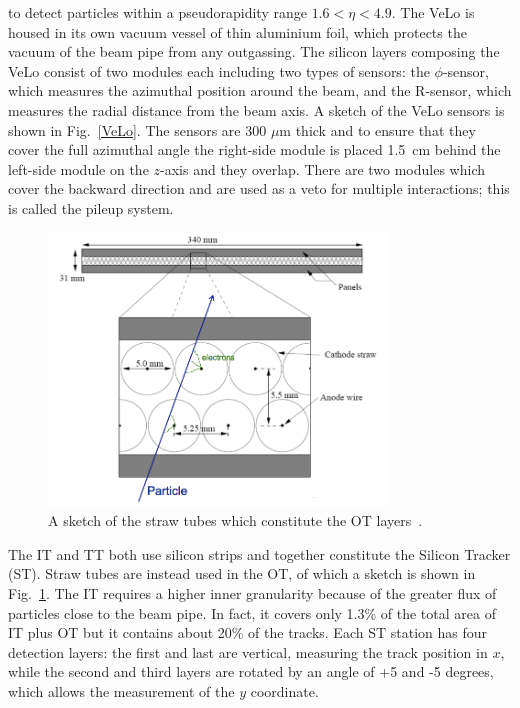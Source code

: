 to detect particles within a pseudorapidity range $1.6 < \eta < 4.9$. The VeLo is housed in its own
vacuum vessel of thin aluminium foil, which protects the vacuum of the beam pipe from any outgassing. 
The silicon layers composing the VeLo consist of two modules each including two types of sensors:
the $\phi$-sensor, which measures the azimuthal position around the beam, and the R-sensor, which measures
the radial distance from the beam axis. A sketch of the VeLo sensors is shown in Fig.~\ref{VeLo}. The sensors
are 300 $\mu$m thick and to ensure that they cover the full azimuthal angle the right-side module is placed
1.5~cm behind the left-side module on the $z$-axis and they overlap. There are two modules which cover the
backward direction and are used as a veto for multiple interactions; this is called the pileup system.
%
\begin{center}
\begin{figure}[h!]
\centering 
\includegraphics[width=0.8\textwidth]{Detector/figs/straw_tubes.png}
\caption{A sketch of the straw tubes which constitute the OT layers~\cite{Alves:2008zz}.}
\label{fig:straw:tubes}
\end{figure}
\end{center}
%
The IT and TT both use silicon strips and together constitute the Silicon Tracker (ST). Straw tubes are instead used 
in the OT, of which a sketch is shown in Fig.~\ref{fig:straw:tubes}. The IT requires a higher inner granularity
because of the greater flux of particles close to the beam pipe. In fact, it covers only 1.3\% of the total
area of IT plus OT but it contains about 20\% of the tracks. Each ST station has four detection layers:
the first and last are vertical, measuring the track position in $x$, while the second 
and third layers are rotated by an angle of +5 and -5 degrees, which allows the measurement of the $y$ coordinate. 
